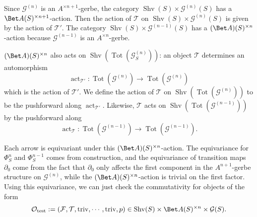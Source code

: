 \documentclass[10pt]{amsart}
\theoremstyle{remark}
\newcommand{\pa}{\partial}
\newcommand{\on}{\operatorname}
\newcommand{\cF}{\mathcal{F}}
\newcommand{\cG}{\mathcal{G}}
\newcommand{\cO}{\mathcal{O}}
\newcommand{\cT}{\mathcal{T}}
\newcommand{\Shv}{\on{Shv}}
\begin{document}
Since $\cG^{(n)}$ is an $A^{\times n+1}$-gerbe, the category $\Shv(S)\times \cG^{(n)}(S)$ has a $\Bet A(S)^{\times n+1}$-action. Then the action of $\cT$ on $\Shv(S)\times \cG^{(n)}(S)$ is given by the action of $\cT'$.
The category $\Shv(S)\times\cG^{(n-1)}(S)$ has a $(\Bet A)(S)^{\times n}$-action because $\cG^{(n-1)}$ is an $A^{\times n}$-gerbe. 
\medskip

$(\Bet A)(S)^{\times n}$ also acts on $\Shv(\on{Tot}(\cG^{(n)}_S))$: an object $\cT$ determines an automorphism 
\[\on{act}_{\cT'}:\on{Tot}(\cG^{(n)})\rightarrow \on{Tot}(\cG^{(n)})\] which is the action of $\cT'$. We define the action of $\cT$ on $\Shv(\on{Tot}(\cG^{(n)}))$ to be the pushforward along $\on{act}_{\cT'}$. Likewise, $\cT$ acts on $\Shv(\on{Tot}(\cG^{(n-1)}))$ by the pushforward along 
\[\on{act}_{\cT}:\on{Tot}(\cG^{(n-1)})\rightarrow \on{Tot}(\cG^{(n-1)}).\]

Each arrow is equivariant under this $(\Bet A)(S)^{\times n}$-action. The equivariance for $\Phi^n_S$ and $\Phi^{n-1}_S$ comes from construction, and the equivariance of transition maps $\pa_0$ come from the fact that $\pa_0$ only affects the first component in the $A^{n+1}$-gerbe structure on $\cG^{(n)}$, while the $(\Bet A)(S)^{\times n}$-action is trivial on the first factor. Using this equivariance, we can just check the commutativity for objects of the form
\begin{equation}\label{eq: test obj}
    \cO_{\on{test}}:=(\cF,\cT,\on{triv},\cdots,\on{triv},p)\in \Shv(S)\times \Bet A(S)^{\times n}\times \cG(S).
\end{equation}
\end{document}
